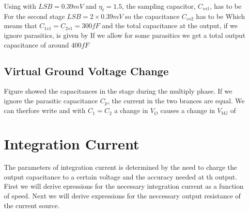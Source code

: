 \begin{exmp}

Using  with $LSB = 0.39mV$ and $\eta_t=1.5$, the
sampling capacitor, $C_{ss1}$, has to be
For the second stage $LSB = 2 \times 0.39mV$ so the capacitance
$C_{ss2}$ has to be
Which means that $C_{1s1} = C_{2s1} = 300fF$ and the total capacitance
at the output, if we ignore parasitics, is given by
If we allow for some parasitics we get a total output capacitance of
around $400fF$

\end{exmp}


\subsection{Virtual Ground Voltage Change}
Figure  showed the capacitances in the stage during the
multiply phase. If we ignore the parasitic capacitance $C_p$, the
current in the two brances are equal. We can therfore write
and with $C_1 = C_2$ a change in $V_O$ causes a change in $V_{VG}$ of

\section{Integration Current}
The parameters of integration current is determined by the need to
charge the output capacitance to a certain voltage and the accuracy
needed at th output. First we will derive epressions for the necessary
integration current as a function of speed. Next we will derive
expressions for the neccessary output resistance of the current
source.

